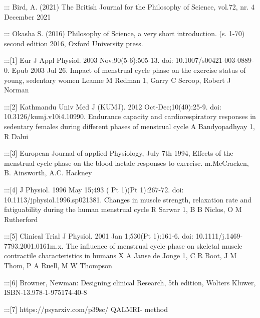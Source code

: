 \documentclass[
  letterpaper,
  DIV=11,
  numbers=noendperiod]{scrreprt}
\begin{document}
::: Bird, A. (2021) The British Journal for the Philosophy of Science,
vol.72, nr. 4 December 2021

::: Okasha S. (2016) Philosophy of Science, a very short introduction.
(s. 1-70) second edition 2016, Oxford University press.

:::{[}1{]} Eur J Appl Physiol. 2003 Nov;90(5-6):505-13. doi:
10.1007/s00421-003-0889-0. Epub 2003 Jul 26. Impact of menstrual cycle
phase on the exercise status of young, sedentary women Leanne M Redman
1, Garry C Scroop, Robert J Norman

:::{[}2{]} Kathmandu Univ Med J (KUMJ). 2012 Oct-Dec;10(40):25-9. doi:
10.3126/kumj.v10i4.10990. Endurance capacity and cardiorespiratory
responses in sedentary females during different phases of menstrual
cycle A Bandyopadhyay 1, R Dalui

:::{[}3{]} European Journal of applied Physiology, July 7th 1994,
Effects of the menstrual cycle phase on the blood lactale responses to
exercise. m.McCracken, B. Ainsworth, A.C. Hackney

:::{[}4{]} J Physiol. 1996 May 15;493 ( Pt 1)(Pt 1):267-72. doi:
10.1113/jphysiol.1996.sp021381. Changes in muscle strength, relaxation
rate and fatiguability during the human menstrual cycle R Sarwar 1, B B
Niclos, O M Rutherford

:::{[}5{]} Clinical Trial J Physiol. 2001 Jan 1;530(Pt 1):161-6. doi:
10.1111/j.1469-7793.2001.0161m.x. The influence of menstrual cycle phase
on skeletal muscle contractile characteristics in humans X A Janse de
Jonge 1, C R Boot, J M Thom, P A Ruell, M W Thompson

:::{[}6{]} Browner, Newman: Designing clinical Research, 5th edition,
Wolters Kluwer, ISBN-13.978-1-975174-40-8

:::{[}7{]} https://psyarxiv.com/p39sc/ QALMRI- method
\end{document}

